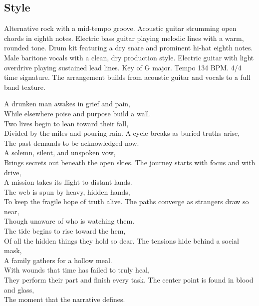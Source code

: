 \subsection{Style}
Alternative rock with a mid-tempo groove. Acoustic guitar strumming open chords in eighth notes. Electric bass guitar playing melodic lines with a warm, rounded tone. Drum kit featuring a dry snare and prominent hi-hat eighth notes. Male baritone vocals with a clean, dry production style. Electric guitar with light overdrive playing sustained lead lines. Key of G major. Tempo 134 BPM. 4/4 time signature. The arrangement builds from acoustic guitar and vocals to a full band texture.

\begin{lyrics}
A drunken man awakes in grief and pain,\\
While elsewhere poise and purpose build a wall.\\
Two lives begin to lean toward their fall,\\
Divided by the miles and pouring rain.
A cycle breaks as buried truths arise,\\
The past demands to be acknowledged now.\\
A solemn, silent, and unspoken vow,\\
Brings secrets out beneath the open skies.
The journey starts with focus and with drive,\\
A mission takes its flight to distant lands.\\
The web is spun by heavy, hidden hands,\\
To keep the fragile hope of truth alive.
The paths converge as strangers draw so near,\\
Though unaware of who is watching them.\\
The tide begins to rise toward the hem,\\
Of all the hidden things they hold so dear.
The tensions hide behind a social mask,\\
A family gathers for a hollow meal.\\
With wounds that time has failed to truly heal,\\
They perform their part and finish every task.
The center point is found in blood and glass,\\
The moment that the narrative defines.\\

\end{lyrics}
